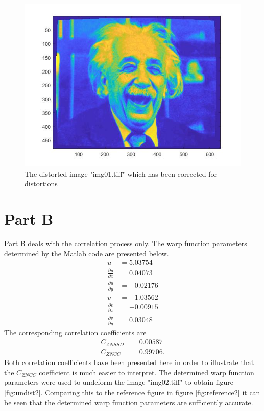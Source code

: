 \documentclass[12pt,oneside,openany,a4paper, %
english, %
masters-t, goldenblock]{usthesis}
\begin{document}
\begin{figure}[H]
    \centering
    \includegraphics[scale=0.6]{partA.jpg}
    \caption{The distorted image "img01.tiff" which has been corrected for distortions}
    \label{fig:undist1}
\end{figure}

\section{Part B}
Part B deals with the correlation process only. The warp function parameters determined by the Matlab code are presented below.
\begin{align}
  u &= 5.03754\\
  \frac{\partial u}{\partial x} &= 0.04073 \\
  \frac{\partial u}{\partial y} &= -0.02176 \\
  v &= -1.03562 \\
  \frac{\partial v}{\partial x} &= -0.00915 \\
  \frac{\partial v}{\partial y} &= 0.03048
\end{align}
The corresponding correlation coefficients are
\begin{align}
  C_{ZNSSD} &= 0.00587 \\
  C_{ZNCC} &= 0.99706.
\end{align}
Both correlation coefficients have been presented here in order to illustrate that the $C_{ZNCC}$ coefficient is much easier to interpret. The determined warp function parameters were used to undeform the image "img02.tiff" to obtain figure \ref{fig:undist2}. Comparing this to the reference figure in figure \ref{fig:reference2} it can be seen that the determined warp function parameters are sufficiently accurate.
\end{document}

